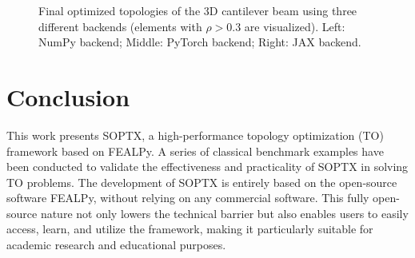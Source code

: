 \documentclass[mathpazo]{cicp}
\begin{document}
\begin{figure}[htp]
	\centering
	\caption{Final optimized topologies of the 3D cantilever beam using three different backends (elements with $\rho>0.3$ are visualized). Left: NumPy backend; Middle: PyTorch backend; Right: JAX backend.}
	\label{fig:canti3d_backend_compare}
\end{figure}

\section{Conclusion}
This work presents SOPTX, a high-performance topology optimization (TO) framework based on FEALPy. A series of classical benchmark examples have been conducted to validate the effectiveness and practicality of SOPTX in solving TO problems. The development of SOPTX is entirely based on the open-source software FEALPy, without relying on any commercial software. This fully open-source nature not only lowers the technical barrier but also enables users to easily access, learn, and utilize the framework, making it particularly suitable for academic research and educational purposes.
\end{document}
